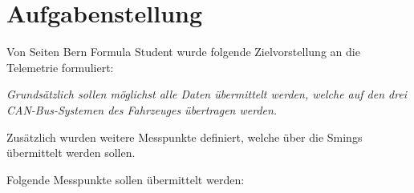 \chapter{Aufgabenstellung}
\label{chap:aufgabenstellung}


Von Seiten Bern Formula Student wurde folgende Zielvorstellung an die Telemetrie formuliert:

\textit{Grundsätzlich sollen möglichst alle Daten übermittelt werden, welche auf den drei CAN-Bus-Systemen des Fahrzeuges übertragen werden.} 

Zusätzlich wurden weitere Messpunkte definiert, welche über die Smings übermittelt werden sollen.

Folgende Messpunkte sollen übermittelt werden:

